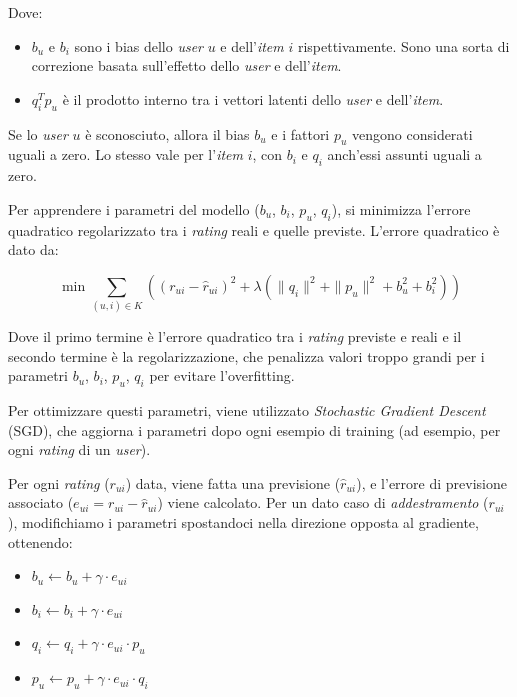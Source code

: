 Dove:
\begin{itemize}
    \item $ b_u $ e $ b_i $ sono i bias dello \textit{user} $u$ e dell'\textit{item} $i$ rispettivamente. Sono una sorta di correzione basata sull'effetto dello \textit{user} e dell'\textit{item}.
    \item $ q_i^T p_u $ è il prodotto interno tra i vettori latenti dello \textit{user} e dell'\textit{item}.
\end{itemize}

Se lo \textit{user} $u$ è sconosciuto, allora il bias $b_u$ e i fattori $p_u$ vengono considerati uguali a zero. Lo stesso vale per
l'\textit{item} $i$, con $b_i$ e $q_i$ anch'essi assunti uguali a zero.

Per apprendere i parametri del modello ($b_u$, $b_i$, $p_u$, $q_i$), si minimizza l'errore quadratico regolarizzato tra i \textit{rating} reali e quelle previste. L'errore quadratico è dato da:

\[
\min \sum\limits_{(u,i) \in K} \left( (r_{ui} - \hat{r}_{ui})^2 + \lambda (\|q_i\|^2 + \|p_u\|^2 + b_u^2 + b_i^2) \right)
\]


Dove il primo termine è l'errore quadratico tra i \textit{rating} previste e reali e il secondo termine è la regolarizzazione, che penalizza valori troppo grandi per i parametri $b_u$, $b_i$, $p_u$, $q_i$ per evitare l'overfitting.

Per ottimizzare questi parametri, viene utilizzato \textit{Stochastic Gradient Descent} (SGD), che aggiorna i parametri dopo ogni  esempio di training (ad esempio, per ogni \textit{rating} di un \textit{user}).

Per ogni \textit{rating} ($r_{ui}$) data, viene fatta una previsione ($\hat{r}_{ui}$), e l'errore di previsione associato ($e_{ui} = r_{ui} - \hat{r}_{ui}$) viene calcolato. Per un dato caso di \textit{addestramento} ($r_{ui}$), modifichiamo i parametri spostandoci nella
direzione opposta al gradiente, ottenendo:

\begin{itemize}
    \item $b_u \leftarrow b_u + \gamma \cdot e_{ui}$
    \item $b_i \leftarrow b_i + \gamma \cdot e_{ui}$
    \item $q_i \leftarrow q_i + \gamma \cdot e_{ui} \cdot p_u$
    \item $p_u \leftarrow p_u + \gamma \cdot e_{ui} \cdot q_i$
\end{itemize}

